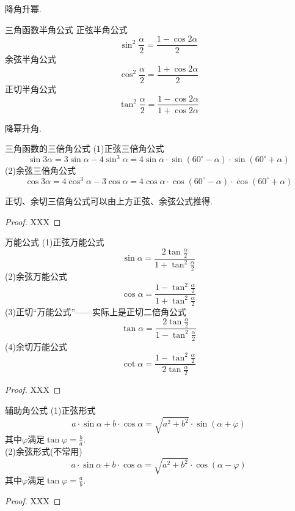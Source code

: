 \documentclass[lang=cn, zihao=4.5]{elegantbook}
\begin{document}
降角升幂.

\begin{proposition}{三角函数半角公式} %
    正弦半角公式$$\sin ^2 \frac{\alpha}{2}=\frac{1-\cos{2\alpha}}{2}$$
    余弦半角公式$$\cos ^2 \frac{\alpha}{2}=\frac{1+\cos{2\alpha}}{2}$$
    正切半角公式$$\tan ^2 \frac{\alpha}{2}=\frac{1-\cos{2\alpha}}{1+\cos{2\alpha}}$$
\end{proposition}

降幂升角.

\begin{proposition}{三角函数的三倍角公式} %
    (1)正弦三倍角公式$$\sin{3\alpha}=3\sin{\alpha}-4\sin^3 \alpha=4\sin{\alpha} \cdot \sin{(60^{\circ}-\alpha)} \cdot \sin{(60^{\circ}+\alpha)}$$
    (2)余弦三倍角公式$$\cos{3\alpha}=4\cos^3 \alpha-3\cos{\alpha}=4\cos{\alpha} \cdot \cos{(60^{\circ}-\alpha)} \cdot \cos{(60^{\circ}+\alpha)}$$
\end{proposition}
\begin{remark}
    正切、余切三倍角公式可以由上方正弦、余弦公式推得.
\end{remark}
\begin{proof}
    XXX
\end{proof}

\begin{proposition}{万能公式} %
    (1)正弦万能公式$$\sin{\alpha}=\frac{2\tan{\frac{\alpha}{2}}}{1+\tan^2{\frac{\alpha}{2}}}$$
    (2)余弦万能公式$$\cos{\alpha}=\frac{1-\tan^2{\frac{\alpha}{2}}}{1+\tan^2{\frac{\alpha}{2}}}$$
    (3)正切“万能公式”——实际上是正切二倍角公式$$\tan{\alpha}=\frac{2\tan{\frac{\alpha}{2}}}{1-\tan^2{\frac{\alpha}{2}}}$$
    (4)余切万能公式$$\cot{\alpha}=\frac{1-\tan^2{\frac{\alpha}{2}}}{2\tan{\frac{\alpha}{2}}}$$
\end{proposition}
\begin{proof}
    XXX
\end{proof}

\begin{proposition}{辅助角公式}
    (1)正弦形式$$a \cdot \sin{\alpha} + b \cdot \cos{\alpha} = \sqrt{a^2+b^2} \cdot \sin{(\alpha + \varphi)}$$
    其中$\varphi$满足$\tan{\varphi}=\frac{b}{a}$.\\
    (2)余弦形式(不常用)$$a \cdot \sin{\alpha} + b \cdot \cos{\alpha} = \sqrt{a^2+b^2} \cdot \cos{(\alpha - \varphi)}$$
    其中$\varphi$满足$\tan{\varphi}=\frac{a}{b}$.
\end{proposition}
\begin{proof}
    XXX
\end{proof}
\end{document}
